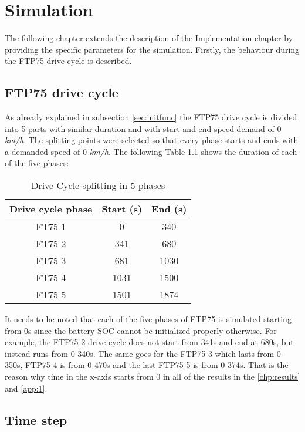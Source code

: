 \chapter{Simulation}
\label{chp:simulation}
The following chapter extends the description of the Implementation chapter by providing the specific parameters for the simulation. Firstly, the behaviour during the FTP75 drive cycle is described.

\section{FTP75 drive cycle}
As already explained in subsection \ref{sec:initfunc} the FTP75 drive cycle is divided into 5 parts with similar duration and with start and end speed demand of 0 \textit{km/h}. The splitting points were selected so that every phase starts and ends with a demanded speed of 0 \textit{km/h}. The following Table \ref{tab:drivecyclephases} shows the duration of each of the five phases:

\begin{table}
\centering
\begin{tabular}{ |c|c|c| } 
 \hline
 Drive cycle phase & Start (s) & End (s) \\
 \hline\hline
 FT75-1 & 0 & 340 \\ 
 FT75-2 & 341 & 680 \\ 
 FT75-3 & 681 & 1030 \\ 
 FT75-4 & 1031 & 1500 \\ 
 FT75-5 & 1501 & 1874 \\ 
 \hline
\end{tabular}
\caption{Drive Cycle splitting in 5 phases}
\label{tab:drivecyclephases}
\end{table}

It needs to be noted that each of the five phases of FTP75 is simulated starting from 0s since the battery SOC cannot be initialized properly otherwise. For example, the FTP75-2 drive cycle does not start from 341s and end at 680s, but instead runs from 0-340s. The same goes for the FTP75-3 which lasts from 0-350s, FTP75-4 is from 0-470s and the last FTP75-5 is from 0-374s. That is the reason why time in the x-axis starts from 0 in all of the results in the \ref{chp:results} and \ref{app:1}.

\section{Time step}


